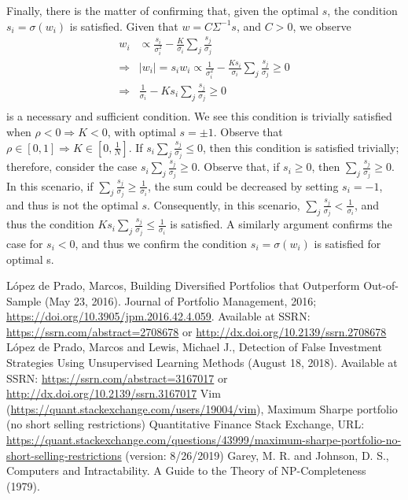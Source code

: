 \documentclass[10pt,twoside,titlepage]{article}   %
\begin{document}
Finally, there is the matter of confirming that, given the optimal $s$, 
the condition $s_i =  \sigma(w_i)$ is satisfied. 
Given that $w = C\Sigma^{-1}s$, and $C>0$, we observe
\begin{equation*}
\begin{aligned}
w_i &\propto \frac{ s_i }{ \sigma_i^2 } - \frac{ K }{ \sigma_i } \sum_j \frac{ s_j }{ \sigma_j } \\
\Rightarrow & | w_i | = s_i w_i \propto \frac{ 1 }{ \sigma_i^2 } - \frac{ K s_i }{ \sigma_i } \sum_j \frac{ s_j }{ \sigma_j } \geq 0 \\
\Rightarrow & \frac{ 1 }{ \sigma_i } - K s_i \sum_j \frac{ s_j }{ \sigma_j } \geq 0 \\
\end{aligned}
\end{equation*}
is a necessary and sufficient condition. We see this condition is 
trivially satisfied when $\rho < 0 \Rightarrow K<0$, 
with optimal $s=\pm 1$. 
Observe that $\rho \in [0,1] \Rightarrow K \in \left[ 0,\frac{1}{N} \right]$. 
If $s_i \sum_j \frac{s_j}{ \sigma_j} \leq 0$, 
then this condition is satisfied trivially; 
therefore, consider the case $s_i \sum_j \frac{ s_j }{ \sigma_j} \geq 0$.
Observe that, if $s_i \geq 0$, then $\sum_j \frac{s_j}{ \sigma_j} \geq 0$.
In this scenario, if $\sum_j \frac{s_j}{ \sigma_j} \geq \frac{1}{\sigma_i}$,
the sum could be decreased by setting $s_i=-1$, 
and thus is not the optimal $s$. 
Consequently, in this scenario, $\sum_j \frac{s_j}{ \sigma_j} < \frac{1}{\sigma_i}$, 
and thus the condition $K s_i \sum_j \frac{s_j}{\sigma_j} \leq \frac{1}{\sigma_i}$ is satisfied. 
A similarly argument confirms the case for $s_i<0$, and thus we confirm the condition 
$s_i=\sigma(w_i)$ is satisfied for optimal s.


\begin{thebibliography}{9}
L\'opez de Prado, Marcos, Building Diversified Portfolios that Outperform Out-of-Sample (May 23, 2016). Journal of Portfolio Management, 2016; \url{https://doi.org/10.3905/jpm.2016.42.4.059}. 
Available at SSRN: \url{https://ssrn.com/abstract=2708678} or \url{http://dx.doi.org/10.2139/ssrn.2708678}
L\'opez de Prado, Marcos and Lewis, Michael J., Detection of False Investment Strategies Using Unsupervised Learning Methods (August 18, 2018). 
Available at SSRN: \url{https://ssrn.com/abstract=3167017} or \url{http://dx.doi.org/10.2139/ssrn.3167017}
Vim (\url{https://quant.stackexchange.com/users/19004/vim}), Maximum Sharpe portfolio (no short selling restrictions) 
Quantitative Finance Stack Exchange, URL: \url{https://quant.stackexchange.com/questions/43999/maximum-sharpe-portfolio-no-short-selling-restrictions} (version: 8/26/2019)
Garey, M. R. and Johnson, D. S., Computers and Intractability. A Guide to the Theory of NP-Completeness (1979).
\end{thebibliography}
\end{document}
